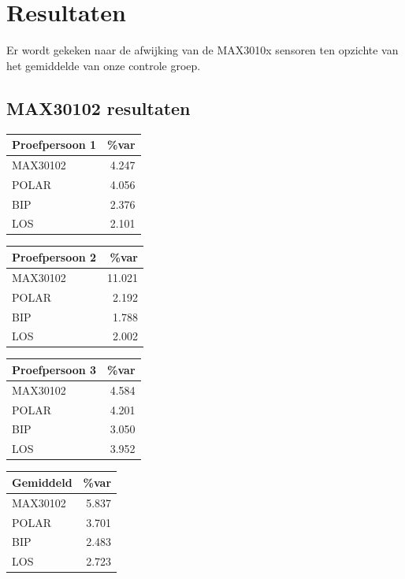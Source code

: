 \documentclass[11pt]{article}
\begin{document}
    \section{Resultaten}\label{sec:resultaten}
Er wordt gekeken naar de afwijking van de MAX3010x sensoren ten opzichte van het gemiddelde van onze controle groep.


\subsection{MAX30102 resultaten}\label{subsec:max30102 resultaten}

	\begin{table}[H]
	\begin{tabular}{l|r}
\textbf{Proefpersoon 1}  & \%var  \\
	\hline
	MAX30102	& 4.247  \\
	POLAR		& 4.056  \\
	BIP		& 2.376  \\
	LOS		& 2.101  \\
	\end{tabular}
	\end{table}


	\begin{table}[H]
	\begin{tabular}{l|r}
		\textbf{Proefpersoon 2}  & \%var  \\
	\hline
	MAX30102	& 11.021 \\
	POLAR		& 2.192  \\
	BIP		& 1.788  \\
	LOS		& 2.002  \\
	\end{tabular}
	\end{table}

	\begin{table}[H]
	\begin{tabular}{l|r}
		\textbf{Proefpersoon 3}  & \%var  \\
	\hline
	MAX30102	& 4.584  \\
	POLAR		& 4.201  \\
	BIP		& 3.050  \\
	LOS		& 3.952  \\
	\end{tabular}
	\end{table}


	\begin{table}[H]
	\begin{tabular}{l|r}
		\textbf{Gemiddeld   }\hspace{0.7cm}  & \%var  \\
		\hline
	MAX30102	& 5.837  \\
	POLAR		& 3.701  \\
	BIP		& 2.483  \\
	LOS		& 2.723  \\
	\end{tabular}
	\end{table}
	
\end{document}
